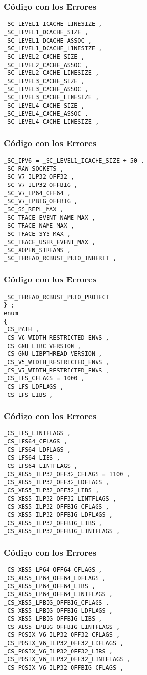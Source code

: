 \documentclass{beamer}
\begin{document}
\begin{frame}[fragile]
\frametitle{C\'odigo con los Errores}
\begin{verbatim}
_SC_LEVEL1_ICACHE_LINESIZE , 
_SC_LEVEL1_DCACHE_SIZE , 
_SC_LEVEL1_DCACHE_ASSOC , 
_SC_LEVEL1_DCACHE_LINESIZE , 
_SC_LEVEL2_CACHE_SIZE , 
_SC_LEVEL2_CACHE_ASSOC , 
_SC_LEVEL2_CACHE_LINESIZE , 
_SC_LEVEL3_CACHE_SIZE , 
_SC_LEVEL3_CACHE_ASSOC , 
_SC_LEVEL3_CACHE_LINESIZE , 
_SC_LEVEL4_CACHE_SIZE , 
_SC_LEVEL4_CACHE_ASSOC , 
_SC_LEVEL4_CACHE_LINESIZE , 
\end{verbatim}
\end{frame}
\begin{frame}[fragile]
\frametitle{C\'odigo con los Errores}
\begin{verbatim}
_SC_IPV6 = _SC_LEVEL1_ICACHE_SIZE + 50 , 
_SC_RAW_SOCKETS , 
_SC_V7_ILP32_OFF32 , 
_SC_V7_ILP32_OFFBIG , 
_SC_V7_LP64_OFF64 , 
_SC_V7_LPBIG_OFFBIG , 
_SC_SS_REPL_MAX , 
_SC_TRACE_EVENT_NAME_MAX , 
_SC_TRACE_NAME_MAX , 
_SC_TRACE_SYS_MAX , 
_SC_TRACE_USER_EVENT_MAX , 
_SC_XOPEN_STREAMS , 
_SC_THREAD_ROBUST_PRIO_INHERIT , 
\end{verbatim}
\end{frame}
\begin{frame}[fragile]
\frametitle{C\'odigo con los Errores}
\begin{verbatim}
_SC_THREAD_ROBUST_PRIO_PROTECT 
} ; 
enum 
{ 
_CS_PATH , 
_CS_V6_WIDTH_RESTRICTED_ENVS , 
_CS_GNU_LIBC_VERSION , 
_CS_GNU_LIBPTHREAD_VERSION , 
_CS_V5_WIDTH_RESTRICTED_ENVS , 
_CS_V7_WIDTH_RESTRICTED_ENVS , 
_CS_LFS_CFLAGS = 1000 , 
_CS_LFS_LDFLAGS , 
_CS_LFS_LIBS , 
\end{verbatim}
\end{frame}
\begin{frame}[fragile]
\frametitle{C\'odigo con los Errores}
\begin{verbatim}
_CS_LFS_LINTFLAGS , 
_CS_LFS64_CFLAGS , 
_CS_LFS64_LDFLAGS , 
_CS_LFS64_LIBS , 
_CS_LFS64_LINTFLAGS , 
_CS_XBS5_ILP32_OFF32_CFLAGS = 1100 , 
_CS_XBS5_ILP32_OFF32_LDFLAGS , 
_CS_XBS5_ILP32_OFF32_LIBS , 
_CS_XBS5_ILP32_OFF32_LINTFLAGS , 
_CS_XBS5_ILP32_OFFBIG_CFLAGS , 
_CS_XBS5_ILP32_OFFBIG_LDFLAGS , 
_CS_XBS5_ILP32_OFFBIG_LIBS , 
_CS_XBS5_ILP32_OFFBIG_LINTFLAGS , 
\end{verbatim}
\end{frame}
\begin{frame}[fragile]
\frametitle{C\'odigo con los Errores}
\begin{verbatim}
_CS_XBS5_LP64_OFF64_CFLAGS , 
_CS_XBS5_LP64_OFF64_LDFLAGS , 
_CS_XBS5_LP64_OFF64_LIBS , 
_CS_XBS5_LP64_OFF64_LINTFLAGS , 
_CS_XBS5_LPBIG_OFFBIG_CFLAGS , 
_CS_XBS5_LPBIG_OFFBIG_LDFLAGS , 
_CS_XBS5_LPBIG_OFFBIG_LIBS , 
_CS_XBS5_LPBIG_OFFBIG_LINTFLAGS , 
_CS_POSIX_V6_ILP32_OFF32_CFLAGS , 
_CS_POSIX_V6_ILP32_OFF32_LDFLAGS , 
_CS_POSIX_V6_ILP32_OFF32_LIBS , 
_CS_POSIX_V6_ILP32_OFF32_LINTFLAGS , 
_CS_POSIX_V6_ILP32_OFFBIG_CFLAGS , 
\end{verbatim}
\end{frame}
\end{document}
